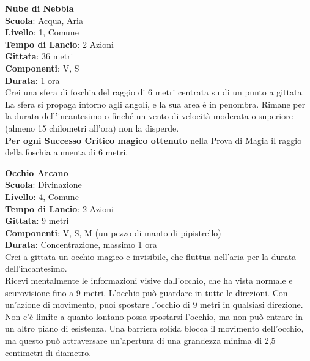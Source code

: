 \begin{multicols}{2}
\medskip\textbf{Nube di Nebbia}\\
\textbf{Scuola}: Acqua, Aria\\
\textbf{Livello}: 1, Comune\\
\textbf{Tempo di Lancio}: 2 Azioni\\
\textbf{Gittata}: 36 metri\\
\textbf{Componenti}: V, S\\
\textbf{Durata}: 1 ora\\
Crei una sfera di foschia del raggio di 6 metri centrata su di un punto a gittata. La sfera si propaga intorno agli angoli, e la sua area è in penombra. Rimane per la durata dell'incantesimo o finché un vento di velocità moderata o superiore (almeno 15 chilometri all'ora) non la disperde.\\
\textbf{Per ogni Successo Critico magico ottenuto} nella Prova di Magia il raggio della foschia aumenta di 6 metri.

\medskip\textbf{Occhio Arcano}\\
\textbf{Scuola}: Divinazione\\
\textbf{Livello}: 4, Comune\\
\textbf{Tempo di Lancio}: 2 Azioni\\
\textbf{Gittata}: 9 metri\\
\textbf{Componenti}: V, S, M (un pezzo di manto di pipistrello)\\
\textbf{Durata}: Concentrazione, massimo 1 ora\\
Crei a gittata un occhio magico e invisibile, che fluttua nell'aria per la durata dell'incantesimo.\\
Ricevi mentalmente le informazioni visive dall'occhio, che ha vista normale e scurovisione fino a 9 metri. L'occhio può guardare in tutte le direzioni. Con un'azione di movimento, puoi spostare l'occhio di 9 metri in qualsiasi direzione. Non c'è limite a quanto lontano possa spostarsi l'occhio, ma non può entrare in un altro piano di esistenza. Una barriera solida blocca il movimento dell'occhio, ma questo può attraversare un'apertura di una grandezza minima di 2,5 centimetri di diametro.


\end{multicols}
